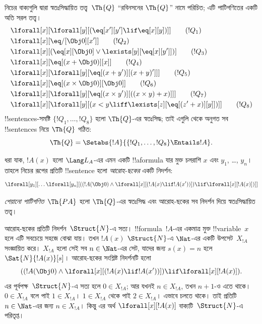 \documentclass[../../../include/open-logic-section]{subfiles}
\begin{document}
\begin{defn}
নিচের বাক্যগুলি দ্বারা স্বতঃসিদ্ধায়িত তত্ত্ব~$\Th{Q}$ ``রবিনসনের
$\Th{Q}$'' নামে পরিচিত; এটি পাটিগণিতের একটি অতি সরল তত্ত্ব।
\begin{align*}
& \lforall[x][\lforall[y][(\eq[x'][y'] \lif \eq[x][y])]] \tag{$!Q_1$}\\
& \lforall[x][\eq/[\Obj 0][x']] \tag{$!Q_2$}\\
& \lforall[x][(\eq[x][\Obj 0] \lor \lexists[y][\eq[x][y']])] \tag{$!Q_3$}\\
& \lforall[x][\eq[(x + \Obj 0)][x]] \tag{$!Q_4$}\\
& \lforall[x][\lforall[y][\eq[(x + y')][(x + y)']]] \tag{$!Q_5$}\\
& \lforall[x][\eq[(x \times \Obj 0)][\Obj 0]] \tag{$!Q_6$}\\
& \lforall[x][\lforall[y][\eq[(x \times y')][((x \times y) + x)]]] \tag{$!Q_7$}\\
& \lforall[x][\lforall[y][(x < y \liff \lexists[z][\eq[(z' + x)][y]])]] \tag{$!Q_8$}
\end{align*}
!!{sentence}s-সমষ্টি $\{!Q_1, \dots, !Q_8\}$ হলো $\Th{Q}$-এর স্বতঃসিদ্ধ;
তাই এগুলি থেকে অনুগত সব !!{sentence}s নিয়ে $\Th{Q}$ গঠিত:
\[
\Th{Q} = \Setabs{!A}{\{!Q_1, \dots, !Q_8\} \Entails !A}.
\]
\end{defn}

\begin{defn}
ধরা যাক, $!A(x)$ হলো $\Lang L_A$-এর এমন একটি !!a{formula} যার মুক্ত চলরাশি
$x$ এবং $y_1$, \dots, $y_n$। তাহলে নিচের রূপের প্রতিটি !!{sentence} হলো
\emph{আরোহ-ছকের} একটি নিদর্শন:
\[
\lforall[y_1][\dots\lforall[y_n][((!A(\Obj 0) \land \lforall[x][(!A(x)
\lif !A(x'))]) \lif \lforall[x][!A(x)])]]
\]

\emph{পেয়ানো পাটিগণিত}~$\Th{PA}$ হলো $\Th{Q}$-এর স্বতঃসিদ্ধ এবং আরোহ-ছকের
সব নিদর্শন দিয়ে স্বতঃসিদ্ধায়িত তত্ত্ব।
\end{defn}

\begin{explain}
আরোহ-ছকের প্রতিটি নিদর্শন~$\Struct{N}$-এ সত্য। !!{formula}~$!A$-এর একমাত্র
মুক্ত !!{variable}~$x$ হলে এটি সবচেয়ে সহজে বোঝা যায়। তখন $!A(x)$
$\Struct{N}$-এ $\Nat$-এর একটি উপসেট~$X_{!A}$ সংজ্ঞায়িত করে। $X_{!A}$ হলো
সেই সব $n \in \Nat$-এর সেট, যাদের জন্য $s(x) = n$ হলে
$\Sat{N}{!A(x)}[s]$। আরোহ-ছকের সংশ্লিষ্ট নিদর্শনটি হলো
\[
((!A(\Obj 0) \land \lforall[x][(!A(x) \lif !A(x'))]) \lif
  \lforall[x][!A(x)]).
\]
এর পূর্বপক্ষ~$\Struct{N}$-এ সত্য হলে $0 \in X_{!A}$; আর যখনই
$n \in X_{!A}$, তখন $n+1$-ও এতে থাকে। $0 \in X_{!A}$ বলে পাই
$1 \in X_{!A}$। $1 \in X_{!A}$ থেকে পাই $2 \in X_{!A}$। এভাবে চলতে
থাকে। তাই প্রতিটি $n \in \Nat$-এর জন্য $n \in X_{!A}$। কিন্তু এর অর্থ
$\lforall[x][!A(x)]$ বাক্যটি~$\Struct{N}$-এ পরিতৃপ্ত।
\end{explain}
\end{document}
